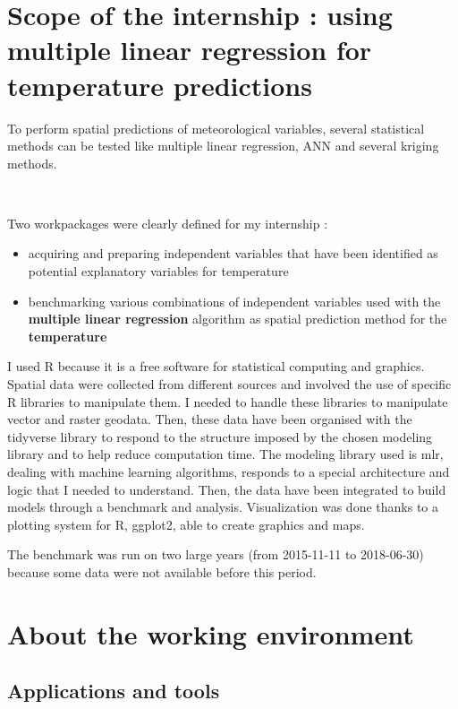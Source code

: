 \documentclass[12pt,twoside]{reedthesis}
\providecommand{\tightlist}{%
  \setlength{\itemsep}{0pt}\setlength{\parskip}{0pt}}
\theoremstyle{definition}
\theoremstyle{definition}
\theoremstyle{definition}
\theoremstyle{remark}
\begin{document}
\section{Scope of the internship : using multiple linear regression for
temperature
predictions}\label{scope-of-the-internship-using-multiple-linear-regression-for-temperature-predictions}

To perform spatial predictions of meteorological variables, several
statistical methods can be tested like multiple linear regression, ANN
and several kriging methods.

~

Two workpackages were clearly defined for my internship :
\begin{itemize}
\tightlist
\item
  acquiring and preparing independent variables that have been
  identified as potential explanatory variables for temperature
\item
  benchmarking various combinations of independent variables used with
  the \textbf{multiple linear regression} algorithm as spatial
  prediction method for the \textbf{temperature}
\end{itemize}
I used R because it is a free software for statistical computing and
graphics. Spatial data were collected from different sources and
involved the use of specific R libraries to manipulate them. I needed to
handle these libraries to manipulate vector and raster geodata. Then,
these data have been organised with the tidyverse library to respond to
the structure imposed by the chosen modeling library and to help reduce
computation time. The modeling library used is mlr, dealing with machine
learning algorithms, responds to a special architecture and logic that I
needed to understand. Then, the data have been integrated to build
models through a benchmark and analysis. Visualization was done thanks
to a plotting system for R, ggplot2, able to create graphics and maps.

The benchmark was run on two large years (from 2015-11-11 to 2018-06-30)
because some data were not available before this period.

\section{About the working
environment}\label{about-the-working-environment}

\subsection{Applications and tools}\label{applications-and-tools}
\end{document}

